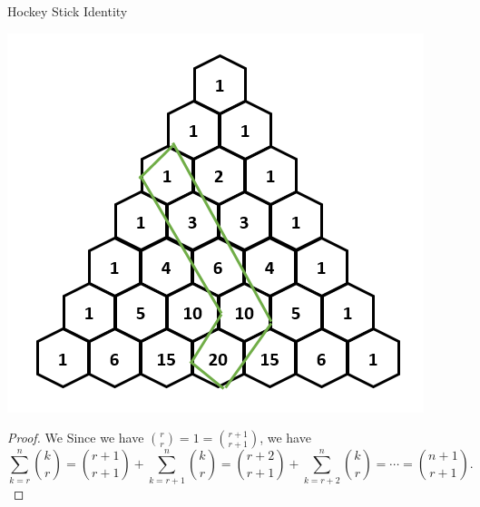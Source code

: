 \begin{mysubsection}{}
\begin{theorem}[thm:]{Hockey Stick Identity}
\begin{minipage}{.3\linewidth}
            \includegraphics[width=\linewidth]{./co3_pic/PascalTriangleHockyStick.png}
        \end{minipage}
    \end{theorem}

    \begin{proof}
        We Since we have ${r\choose r}=1={r+1\choose r+1}$, we have 
        \[\sum_{k=r}^{n}{k\choose r}={r+1\choose r+1}+\sum_{k=r+1}^{n}{k\choose r}={r+2\choose r+1}+\sum_{k=r+2}^{n}{k\choose r}=\cdots ={n+1\choose r+1}.\]
    \end{proof}
\end{mysubsection}

